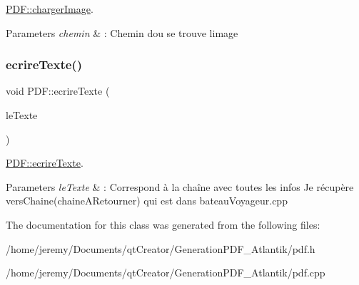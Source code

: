 \hyperlink{class_p_d_f_a3c7d97ad7f3c7a390272d05c7f95e832}{P\+D\+F\+::charger\+Image}. 


\begin{DoxyParams}{Parameters}
{\em chemin} & \+: Chemin d\textquotesingle{}ou se trouve l\textquotesingle{}image \\
\hline
\end{DoxyParams}
\mbox{\label{class_p_d_f_a7bb38923f4141702b3772ec41213917f}} 
\subsubsection{\texorpdfstring{ecrire\+Texte()}{ecrireTexte()}}
{\footnotesize\ttfamily void P\+D\+F\+::ecrire\+Texte (\begin{DoxyParamCaption}\item[{Q\+String}]{le\+Texte }\end{DoxyParamCaption})}



\hyperlink{class_p_d_f_a7bb38923f4141702b3772ec41213917f}{P\+D\+F\+::ecrire\+Texte}. 


\begin{DoxyParams}{Parameters}
{\em le\+Texte} & \+: Correspond à la chaîne avec toutes les infos Je récupère vers\+Chaine(chaine\+A\+Retourner) qui est dans bateau\+Voyageur.\+cpp \\
\hline
\end{DoxyParams}


The documentation for this class was generated from the following files\+:\begin{DoxyCompactItemize}
\item 
/home/jeremy/\+Documents/qt\+Creator/\+Generation\+P\+D\+F\+\_\+\+Atlantik/pdf.\+h\item 
/home/jeremy/\+Documents/qt\+Creator/\+Generation\+P\+D\+F\+\_\+\+Atlantik/pdf.\+cpp\end{DoxyCompactItemize}
